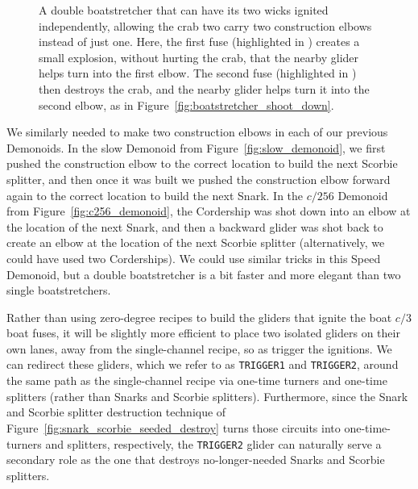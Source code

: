 \begin{figure}[!htb]
	\centering
	
	\caption{A double boatstretcher that can have its two wicks ignited independently, allowing the crab two carry two construction elbows instead of just one. Here, the first fuse (highlighted in ) creates a small explosion, without hurting the crab, that the nearby glider helps turn into the first elbow. The second fuse (highlighted in ) then destroys the crab, and the nearby glider helps turn it into the second elbow, as in Figure~\ref{fig:boatstretcher_shoot_down}.}\label{fig:double_boatstretcher_shoot_down}
\end{figure}

We similarly needed to make two construction elbows in each of our previous Demonoids. In the slow Demonoid from Figure~\ref{fig:slow_demonoid}, we first pushed the construction elbow to the correct location to build the next Scorbie splitter, and then once it was built we pushed the construction elbow forward again to the correct location to build the next Snark. In the $c/256$ Demonoid from Figure~\ref{fig:c256_demonoid}, the Cordership was shot down into an elbow at the location of the next Snark, and then a backward glider was shot back to create an elbow at the location of the next Scorbie splitter (alternatively, we could have used two Corderships). We could use similar tricks in this Speed Demonoid, but a double boatstretcher is a bit faster and more elegant than two single boatstretchers.

Rather than using zero-degree recipes to build the gliders that ignite the boat $c/3$ boat fuses, it will be slightly more efficient to place two isolated gliders on their own lanes, away from the single-channel recipe, so as trigger the ignitions. We can redirect these gliders, which we refer to as \texttt{TRIGGER1} and \texttt{TRIGGER2}, around the same path as the single-channel recipe via one-time turners and one-time splitters (rather than Snarks and Scorbie splitters). Furthermore, since the Snark and Scorbie splitter destruction technique of Figure~\ref{fig:snark_scorbie_seeded_destroy} turns those circuits into one-time-turners and splitters, respectively, the \texttt{TRIGGER2} glider can naturally serve a secondary role as the one that destroys no-longer-needed Snarks and Scorbie splitters.

